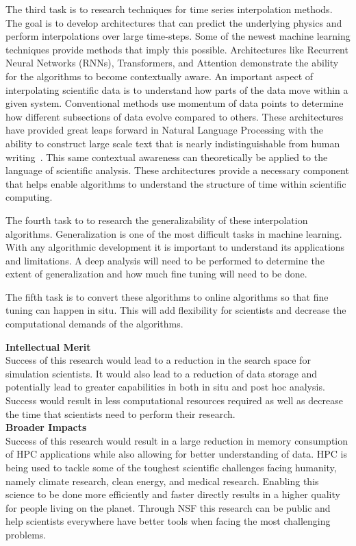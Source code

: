 \documentclass[12pt]{article}
\begin{document}
 The third task is to research techniques for time series interpolation
methods. The goal is to develop architectures that can predict 
the underlying physics and perform interpolations over large time-steps. Some
of the newest machine learning techniques provide methods that imply this
possible. Architectures like Recurrent Neural Networks (RNNs), Transformers, and
Attention demonstrate the ability for the algorithms to become contextually
aware. An important aspect of interpolating scientific data is to understand how
parts of the data move within a given system. Conventional methods use momentum
of data points to determine how different subsections of data evolve compared to
others. These architectures have provided great leaps forward in Natural
Language Processing with the ability to construct large scale text that is
nearly indistinguishable from human writing~\cite{radford2019language}. This
same contextual awareness can theoretically be applied to the language of
scientific analysis. These architectures provide a necessary component that
helps enable algorithms to understand the structure of time within scientific
computing. 

 The fourth task to to research the generalizability of these
interpolation algorithms. Generalization is one of the most difficult tasks in
machine learning. With any algorithmic development it is important to understand
its applications and limitations. A deep analysis will need to be performed to
determine the extent of generalization and how much fine tuning will need to be
done. 

 The fifth task is to convert these algorithms to online algorithms so
that fine tuning can happen in situ. This will add flexibility for scientists
and decrease the computational demands of the algorithms. 


\textbf{Intellectual Merit}
\\
Success of this research would lead to a reduction in the search space for
simulation scientists. It would also lead to a reduction of data storage and
potentially lead to greater capabilities in both in situ and post hoc analysis. 
Success would result in less computational resources required as well as
decrease the time that scientists need to perform their research. 
%
\\\textbf{Broader Impacts} 
\\
Success of this research would result in a large reduction in memory consumption
of HPC applications while also allowing for better understanding of data. HPC is
being used to tackle some of the toughest scientific challenges facing humanity,
namely climate research, clean energy, and medical research. Enabling this
science to be done more efficiently and faster directly results in a higher
quality for people living on the planet. Through NSF this research can be public
and help scientists everywhere have better tools when facing the most
challenging problems.
\end{document}
